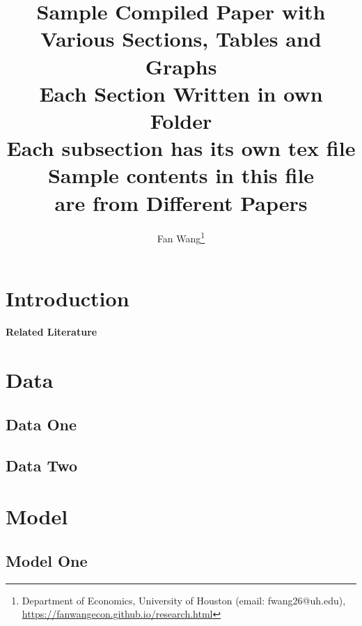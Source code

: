 \documentclass[12pt,english]{article}
\begin{document}
\title{Sample Compiled Paper with \\
       Various Sections, Tables and Graphs \\
       Each Section Written in own Folder \\
       Each subsection has its own tex file \\
       Sample contents in this file \\ are from Different Papers}
\author{Fan Wang\thanks{Department of Economics, University of Houston (email: fwang26@uh.edu), \url{https://fanwangecon.github.io/research.html}}}
\maketitle


\begin{abstract}
\singlespacing \abstractB
\end{abstract}
\vfill
\pagebreak{}

\section{Introduction}

\paragraph{Related Literature}


\section{Data}
\subsection{Data One}

\subsection{Data Two}


\section{Model}
\subsection{Model One}

\end{document}
